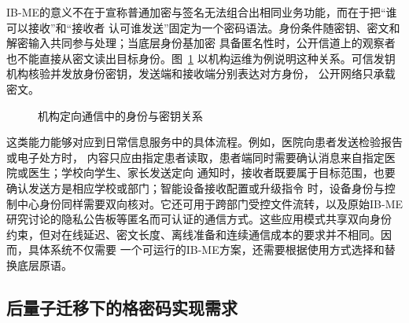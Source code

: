 IB-ME的意义不在于宣称普通加密与签名无法组合出相同业务功能，而在于把“谁可以接收”和“接收者
认可谁发送”固定为一个密码语法。身份条件随密钥、密文和解密输入共同参与处理；当底层身份基加密
具备匿名性时，公开信道上的观察者也不能直接从密文读出目标身份。图~\ref{fig:application-background}
以机构运维为例说明这种关系。可信发钥机构核验并发放身份密钥，发送端和接收端分别表达对方身份，
公开网络只承载密文。

\begin{figure}[H]
\centering
{}
\caption{机构定向通信中的身份与密钥关系}
\label{fig:application-background}
\end{figure}

这类能力能够对应到日常信息服务中的具体流程。例如，医院向患者发送检验报告或电子处方时，
内容只应由指定患者读取，患者端同时需要确认消息来自指定医院或医生；学校向学生、家长发送定向
通知时，接收者既要属于目标范围，也要确认发送方是相应学校或部门；智能设备接收配置或升级指令
时，设备身份与控制中心身份同样需要双向核对。它还可用于跨部门受控文件流转，以及原始IB-ME
研究讨论的隐私公告板等匿名而可认证的通信方式\cite{ateniese2019me}。这些应用模式共享双向身份
约束，但对在线延迟、密文长度、离线准备和连续通信成本的要求并不相同。因而，具体系统不仅需要
一个可运行的IB-ME方案，还需要根据使用方式选择和替换底层原语。

\subsection{后量子迁移下的格密码实现需求}

